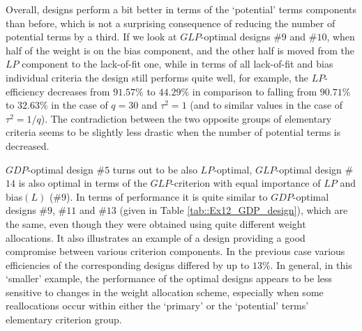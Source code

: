 Overall, designs perform a bit better in terms of the `potential' terms components than before, which is not a surprising consequence of reducing the number of potential terms by a third. If we look at $GLP$-optimal designs \#$9$ and \#$10$, when half of the weight is on the bias component, and the other half is moved from the $LP$ component to the lack-of-fit one, while in terms of all lack-of-fit and bias individual criteria the design still performs quite well, for example, the $LP$-efficiency decreases from $91.57\%$ to $44.29\%$ in comparison to falling from $90.71\%$ to $32.63\%$ in the case of $q=30$ and $\tau^2=1$ (and to similar values in the case of $\tau^2=1/q$). The contradiction between the two opposite groups of elementary criteria seems to be slightly less drastic when the number of potential terms is decreased. 

$GDP$-optimal design \#$5$ turns out to be also $LP$-optimal, $GLP$-optimal design \#$14$ is also optimal in terms of the $GLP$-criterion with equal importance of $LP$ and bias$(L)$ (\#$9$). In terms of performance it is quite similar to $GDP$-optimal designs \#$9$, \#$11$ and \#$13$ (given in Table \ref{tab::Ex12_GDP_design}), which are the same, even though they were obtained using quite different weight allocations. It also illustrates an example of a design providing a good compromise between various criterion components. In the previous case various efficiencies of the corresponding designs differed by up to $13\%$.  In general, in this `smaller' example, the performance of the optimal designs appears to be less sensitive to changes in the weight allocation scheme, especially when some reallocations occur within either the `primary' or the `potential' terms' elementary criterion group. 

